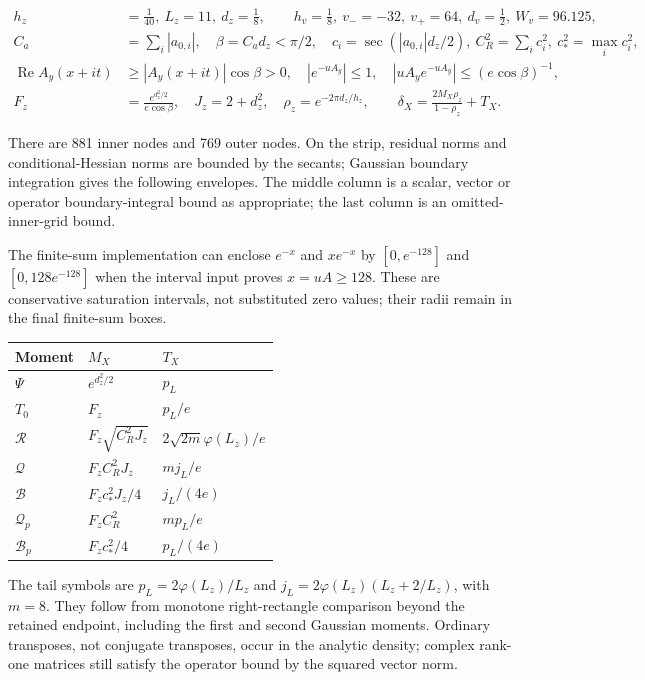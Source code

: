 \documentclass{article}
\begin{document}
\[
\begin{aligned}
h_z&=\tfrac1{40},\ L_z=11,\ d_z=\tfrac18,\qquad
h_v=\tfrac18,\ v_-=-32,\ v_+=64,\ d_v=\tfrac12,\ W_v=96.125,\\
C_a&=\sum_i|a_{0,i}|,\quad\beta=C_ad_z<\pi/2,\quad
c_i=\sec(|a_{0,i}|d_z/2),\ C_R^2=\sum_i c_i^2,\ c_*^2=\max_i c_i^2,\\
\operatorname{Re}A_y(x+it)&\ge|A_y(x+it)|\cos\beta>0,\quad
|e^{-uA_y}|\le1,\quad |uA_ye^{-uA_y}|\le(e\cos\beta)^{-1},\\
F_z&=\frac{e^{d_z^2/2}}{e\cos\beta},\quad J_z=2+d_z^2,\quad
\rho_z=e^{-2\pi d_z/h_z},\qquad
\delta_X=\frac{2M_X\rho_z}{1-\rho_z}+T_X.
\end{aligned}
\tag{I.29}
\]

There are 881 inner nodes and 769 outer nodes. On the strip, residual
norms and conditional-Hessian norms are bounded by the secants; Gaussian
boundary integration gives the following envelopes. The middle column is
a scalar, vector or operator boundary-integral bound as appropriate; the
last column is an omitted-inner-grid bound.

The finite-sum implementation can enclose \(e^{-x}\) and \(xe^{-x}\) by
\([0,e^{-128}]\) and \([0,128e^{-128}]\) when the interval input proves
\(x=uA\ge128\). These are conservative saturation intervals, not
substituted zero values; their radii remain in the final finite-sum
boxes.

\begin{longtable}[]{@{}lll@{}}
\toprule\noalign{}
Moment & \(M_X\) & \(T_X\) \\
\midrule\noalign{}
\endhead
\bottomrule\noalign{}
\endlastfoot
\(\Psi\) & \(e^{d_z^2/2}\) & \(p_L\) \\
\(T_0\) & \(F_z\) & \(p_L/e\) \\
\(\mathcal R\) & \(F_z\sqrt{C_R^2J_z}\) &
\(2\sqrt{2m}\varphi(L_z)/e\) \\
\(\mathcal Q\) & \(F_z C_R^2J_z\) & \(m j_L/e\) \\
\(\mathcal B\) & \(F_z c_*^2J_z/4\) & \(j_L/(4e)\) \\
\(\mathcal Q_p\) & \(F_z C_R^2\) & \(m p_L/e\) \\
\(\mathcal B_p\) & \(F_z c_*^2/4\) & \(p_L/(4e)\) \\
\end{longtable}

The tail symbols are \(p_L=2\varphi(L_z)/L_z\) and
\(j_L=2\varphi(L_z)(L_z+2/L_z)\), with \(m=8\). They follow from
monotone right-rectangle comparison beyond the retained endpoint,
including the first and second Gaussian moments. Ordinary transposes,
not conjugate transposes, occur in the analytic density; complex
rank-one matrices still satisfy the operator bound by the squared vector
norm.
\end{document}
